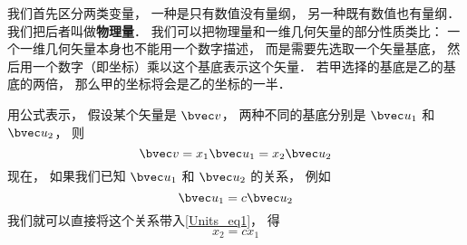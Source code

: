 

我们首先区分两类变量， 一种是只有数值没有量纲， 另一种既有数值也有量纲． 我们把后者叫做\textbf{物理量}． 我们可以把物理量和一维几何矢量的部分性质类比： 一个一维几何矢量本身也不能用一个数字描述， 而是需要先选取一个矢量基底， 然后用一个数字（即坐标）乘以这个基底表示这个矢量． 若甲选择的基底是乙的基底的两倍， 那么甲的坐标将会是乙的坐标的一半．

用公式表示， 假设某个矢量是 $\bvec v$， 两种不同的基底分别是 $\bvec u_1$ 和 $\bvec u_2$， 则
\begin{equation}\label{Units_eq1}
\bvec v = x_1 \bvec u_1 = x_2 \bvec u_2
\end{equation}
现在， 如果我们已知 $\bvec u_1$ 和 $\bvec u_2$ 的关系， 例如
\begin{equation}
\bvec u_1 = c \bvec u_2
\end{equation}
我们就可以直接将这个关系带入\autoref{Units_eq1}， 得
\begin{equation}
x_2 = c x_1
\end{equation}
